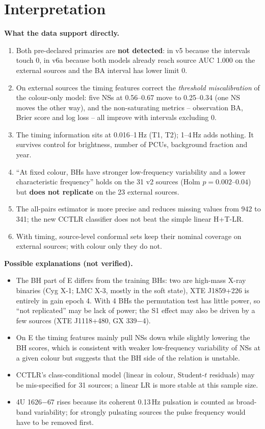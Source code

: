 \section{Interpretation}
\textbf{What the data support directly.}
\begin{enumerate}
\item Both pre-declared primaries are \textbf{not detected}: in v5 because the intervals touch 0, in v6a because both models
already reach source AUC 1.000 on the external sources and the BA interval has lower limit 0.
\item On external sources the timing features correct the \emph{threshold miscalibration} of the colour-only model: five
NSs at 0.56--0.67 move to 0.25--0.34 (one NS moves the other way), and the non-saturating metrics -- observation BA, Brier
score and log loss -- all improve with intervals excluding 0.
\item The timing information sits at 0.016--1\,Hz (T1, T2); 1--4\,Hz adds nothing. It survives control for brightness,
number of PCUs, background fraction and year.
\item ``At fixed colour, BHs have stronger low-frequency variability and a lower characteristic frequency'' holds on the 31
v2 sources (Holm $p=0.002$--$0.04$) but \textbf{does not replicate} on the 23 external sources.
\item The all-pairs estimator is more precise and reduces missing values from 942 to 341; the new CCTLR classifier does not
beat the simple linear H+T-LR.
\item With timing, source-level conformal sets keep their nominal coverage on external sources; with colour only they do not.
\end{enumerate}

\textbf{Possible explanations (not verified).}
\begin{itemize}
\item The BH part of E differs from the training BHs: two are high-mass X-ray binaries (Cyg X-1; LMC X-3, mostly in the soft
state), XTE J1859+226 is entirely in gain epoch 4. With 4 BHs the permutation test has little power, so ``not replicated''
may be lack of power; the S1 effect may also be driven by a few sources (XTE J1118+480, GX 339$-$4).
\item On E the timing features mainly pull NSs down while slightly lowering the BH scores, which is consistent with weaker
low-frequency variability of NSs at a given colour but suggests that the BH side of the relation is unstable.
\item CCTLR's class-conditional model (linear in colour, Student-$t$ residuals) may be mis-specified for 31 sources; a
linear LR is more stable at this sample size.
\item 4U 1626$-$67 rises because its coherent 0.13\,Hz pulsation is counted as broad-band variability; for strongly pulsating
sources the pulse frequency would have to be removed first.
\end{itemize}

